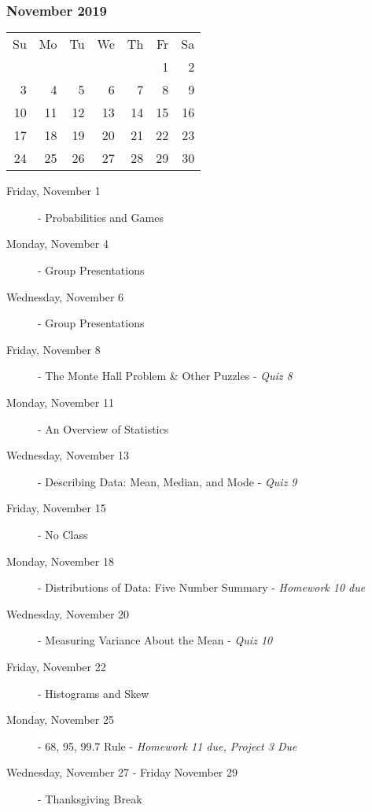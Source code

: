 \documentclass[11pt]{article}
\begin{document}
\subsubsection*{November 2019}
\begin{tabular}{rrrrrrr}
Su & Mo & Tu & We & Th & Fr & Sa\\
   &    &    &    &    &  1 &  2\\
 3 &  4 &  5 &  6 &  7 &  8 &  9\\
10 & 11 & 12 & 13 & 14 & 15 & 16\\
17 & 18 & 19 & 20 & 21 & 22 & 23\\
24 & 25 & 26 & 27 & 28 & 29 & 30\\
\end{tabular}
\begin{description}
\item[Friday, November 1]
  - Probabilities and Games

\item[Monday, November 4]
   - Group Presentations
\item[Wednesday, November 6]
   - Group Presentations
\item[Friday, November 8]
  - The Monte Hall Problem \& Other Puzzles  - {\em Quiz 8}

\item[Monday, November 11]
  - An Overview of Statistics
\item[Wednesday, November 13]
  - Describing Data: Mean, Median, and Mode - {\em Quiz 9}
\item[Friday, November 15] - No Class

\item[Monday, November 18]
  - Distributions of Data: Five Number Summary - {\em Homework 10 due}
\item[Wednesday, November 20]
  - Measuring Variance About the Mean - {\em Quiz 10}
\item[Friday, November 22]
  - Histograms and Skew 

\item[Monday, November 25]
  - 68, 95, 99.7 Rule - {\em Homework 11 due, Project 3 Due}
\item[Wednesday, November 27 - Friday November 29] - Thanksgiving Break
\end{description}

\hrulefill
\end{document}
